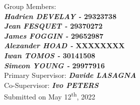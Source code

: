 \begin{center}
Group Members:\\
\textbf{\emph{Hadrien DEVELAY -} 29323738}\\
\textbf{\emph{Jean FESQUET -} 29370272}\\
\textbf{\emph{James FOGGIN -} 29652987}\\
\textbf{\emph{Alexander HOAD -} XXXXXXXX}\\
\textbf{\emph{Iwan TOMOS -} 30141508}\\
\textbf{\emph{Simeon YOUNG -} 29977916}\\[12mm]

Primary Supervisor: \textbf{\emph{Davide LASAGNA}}\\
Co-Supervisor: \textbf{\emph{Ivo PETERS}}\\[12 mm]




Submitted on May 12\textsuperscript{th}, 2022\\[12mm] %

\end{center}